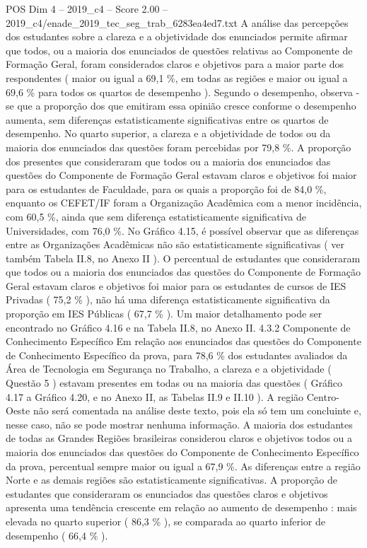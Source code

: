 \begin{textsample}{POS Dim 4 – 2019\_c4 – Score 2.00 – 2019\_c4/enade\_2019\_tec\_seg\_trab\_6283ea4ed7.txt}
A análise das percepções dos estudantes sobre a clareza e a objetividade dos enunciados permite afirmar que todos, ou a maioria dos enunciados de questões relativas ao Componente de Formação Geral, foram considerados claros e objetivos para a maior parte dos respondentes ( maior ou igual a 69,1 \%, em todas as regiões e maior ou igual a 69,6 \% para todos os quartos de desempenho ).
Segundo o desempenho, observa -se que a proporção dos que emitiram essa opinião cresce conforme o desempenho aumenta, sem diferenças estatisticamente significativas entre os quartos de desempenho.
No quarto superior, a clareza e a objetividade de todos ou da maioria dos enunciados das questões foram percebidas por 79,8 \%.
A proporção dos presentes que consideraram que todos ou a maioria dos enunciados das questões do Componente de Formação Geral estavam claros e objetivos foi maior para os estudantes de Faculdade, para os quais a proporção foi de 84,0 \%, enquanto os CEFET/IF foram a Organização Acadêmica com a menor incidência, com 60,5 \%, ainda que sem diferença estatisticamente significativa de Universidades, com 76,0 \%.
No Gráfico 4.15, é possível observar que as diferenças entre as Organizações Acadêmicas não são estatisticamente significativas ( ver também Tabela II.8, no Anexo II ).
O percentual de estudantes que consideraram que todos ou a maioria dos enunciados das questões do Componente de Formação Geral estavam claros e objetivos foi maior para os estudantes de cursos de IES Privadas ( 75,2 \% ), não há uma diferença estatisticamente significativa da proporção em IES Públicas ( 67,7 \% ).
Um maior detalhamento pode ser encontrado no Gráfico 4.16 e na Tabela II.8, no Anexo II. 4.3.2 Componente de Conhecimento Específico Em relação aos enunciados das questões do Componente de Conhecimento Específico da prova, para 78,6 \% dos estudantes avaliados da Área de Tecnologia em Segurança no Trabalho, a clareza e a objetividade ( Questão 5 ) estavam presentes em todas ou na maioria das questões ( Gráfico 4.17 a Gráfico 4.20, e no Anexo II, as Tabelas II.9 e II.10 ).
A região Centro-Oeste não será comentada na análise deste texto, pois ela só tem um concluinte e, nesse caso, não se pode mostrar nenhuma informação.
A maioria dos estudantes de todas as Grandes Regiões brasileiras considerou claros e objetivos todos ou a maioria dos enunciados das questões do Componente de Conhecimento Específico da prova, percentual sempre maior ou igual a 67,9 \%.
As diferenças entre a região Norte e as demais regiões são estatisticamente significativas.
A proporção de estudantes que consideraram os enunciados das questões claros e objetivos apresenta uma tendência crescente em relação ao aumento de desempenho : mais elevada no quarto superior ( 86,3 \% ), se comparada ao quarto inferior de desempenho ( 66,4 \% ).

\end{textsample}

